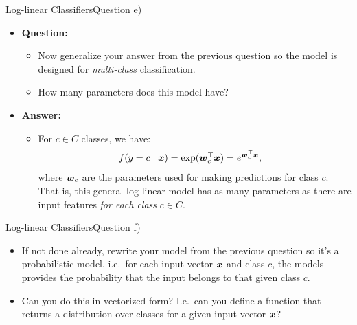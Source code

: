 \documentclass[t]{beamer}
\begin{document}
\begin{frame}{Log-linear Classifiers}{Question e)}
    \begin{itemize}
        \item \textbf{Question:}
              \begin{itemize}
                  \item Now generalize your answer from the previous question so
                        the model is designed for \emph{multi-class}
                        classification.
                  \item How many parameters does this model have?
              \end{itemize}
              \pause
        \item \textbf{Answer:}
              \begin{itemize}
                  \item For $c\in C$ classes, we have:
                        \begin{align}\label{eq:log_linear}
                            f(y=c\mid{\boldsymbol{x}}) & = \exp({\boldsymbol{w}}_c^\top{\boldsymbol{x}}) = e^{{\boldsymbol{w}}_c^\top{\boldsymbol{x}}},
                        \end{align}
                        where ${\boldsymbol{w}}_c$ are the parameters used for making
                        predictions for class $c$.
                        That is, this general log-linear model has as many
                        parameters as there are input features
                        \emph{for each class} $c\in C$.
              \end{itemize}
    \end{itemize}
\end{frame}

\begin{frame}{Log-linear Classifiers}{Question f)}
    \begin{itemize}
        \item If not done already, rewrite your model from the
              previous question so it's a probabilistic model, i.e.\
              for each input vector ${\boldsymbol{x}}$ and class $c$, the models
              provides the probability that the input belongs to that
              given class $c$.
        \item Can you do this in vectorized form? I.e.\ can you define
              a function that returns a distribution over classes for
              a given input vector ${\boldsymbol{x}}$?
    \end{itemize}
\end{frame}
\end{document}
